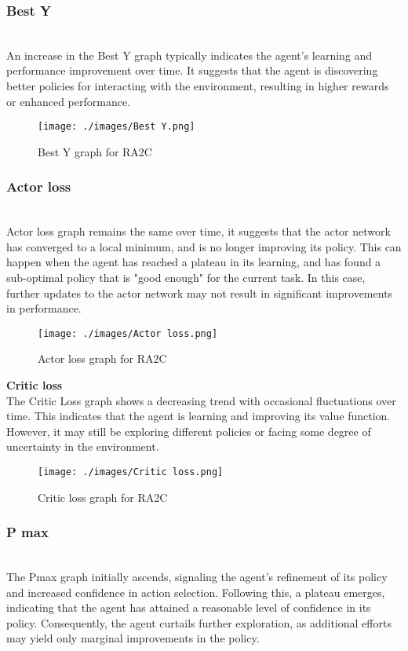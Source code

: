 \documentclass[preprint,12pt]{elsarticle}
\begin{document}
\subsubsection{Best Y}\\
An increase in the Best Y graph typically indicates the agent's learning and performance improvement over time. It suggests that the agent is discovering better policies for interacting with the environment, resulting in higher rewards or enhanced performance.\\
\begin{figure}[!htbp]
    \centering
    \texttt{[image: ./images/Best Y.png]}
    \caption{Best Y graph for RA2C}
\end{figure}


\subsubsection{Actor loss}\\
Actor loss graph remains the same over time, it suggests that the actor network has converged to a local minimum, and is no longer improving its policy. This can happen when the agent has reached a plateau in its learning, and has found a sub-optimal policy that is "good enough" for the current task. In this case, further updates to the actor network may not result in significant improvements in performance.\\

\begin{figure}[!htbp]
    \centering
    \texttt{[image: ./images/Actor loss.png]}
    \caption{Actor loss graph for RA2C}
\end{figure}

\textbf{Critic loss}\\
The Critic Loss graph shows a decreasing trend with occasional fluctuations over time. This indicates that the agent is learning and improving its value function. However, it may still be exploring different policies or facing some degree of uncertainty in the environment.\\
\begin{figure}[!htbp]
    \centering
    \texttt{[image: ./images/Critic loss.png]}
    \caption{Critic loss graph for RA2C}

\end{figure}

\subsubsection{P max}\\
The Pmax graph initially ascends, signaling the agent's refinement of its policy and increased confidence in action selection. Following this, a plateau emerges, indicating that the agent has attained a reasonable level of confidence in its policy. Consequently, the agent curtails further exploration, as additional efforts may yield only marginal improvements in the policy.\\
\end{document}

